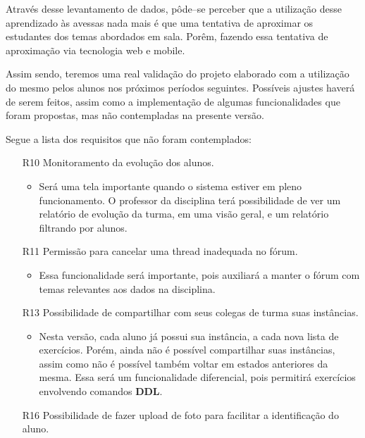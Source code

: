 \documentclass[graduacao,brazil]{ThesisPUC}
\begin{document}
Atrav\'{e}s desse levantamento de dados, p\^{o}de--se perceber que a utiliza\c{c}\~{a}o 
desse aprendizado \`{a}s avessas \cite{FlippedLearning} nada mais \'{e} que uma tentativa
de aproximar os estudantes dos temas abordados em sala. Por\^{e}m, fazendo essa tentativa
de aproxima\c{c}\~{a}o via tecnologia web e mobile.

Assim sendo, teremos uma real valida\c{c}\~{a}o do projeto elaborado com a utiliza\c{c}\~{a}o
do mesmo pelos alunos nos pr\'{o}ximos per\'{i}odos seguintes. Poss\'{i}veis ajustes haver\'{a}
de serem feitos, assim como a implementa\c{c}\~{a}o de algumas funcionalidades que foram propostas,
mas n\~{a}o contempladas na presente vers\~{a}o.

Segue a lista dos requisitos que n\~{a}o foram contemplados:

\begin{itemize}
  \item [R10] Monitoramento da evolu\c{c}\~{a}o dos alunos.
  \begin{itemize}
    \item Ser\'{a} uma tela importante quando o sistema estiver em pleno funcionamento.
	  O professor da disciplina ter\'{a} possibilidade de ver um relat\'{o}rio de
	  evolu\c{c}\~{a}o da turma, em uma vis\~{a}o geral, e um relat\'{o}rio filtrando
	  por alunos.
  \end{itemize}
  \item [R11] Permiss\~{a}o para cancelar uma thread inadequada no f\'{o}rum.
  \begin{itemize}
    \item Essa funcionalidade ser\'{a} importante, pois auxiliar\'{a} a manter o f\'{o}rum
	  com temas relevantes aos dados na disciplina.
  \end{itemize}
  \item [R13] Possibilidade de compartilhar com seus colegas de turma suas inst\^{a}ncias.
  \begin{itemize}
    \item Nesta vers\~{a}o, cada aluno j\'{a} possui sua inst\^{a}ncia, a cada nova lista
	  de exerc\'{i}cios. Por\'{e}m, ainda n\~{a}o \'{e} poss\'{i}vel compartilhar suas
	  inst\^{a}ncias, assim  como n\~{a}o \'{e} poss\'{i}vel tamb\'{e}m voltar em estados
	  anteriores da mesma. Essa ser\'{a} um funcionalidade diferencial, pois permitir\'{a}
	  exerc\'{i}cios envolvendo comandos \textbf{DDL}.
  \end{itemize}
  \item [R16] Possibilidade de fazer upload de foto para facilitar a identifica\c{c}\~{a}o do aluno.

\end{itemize}
\end{document}
